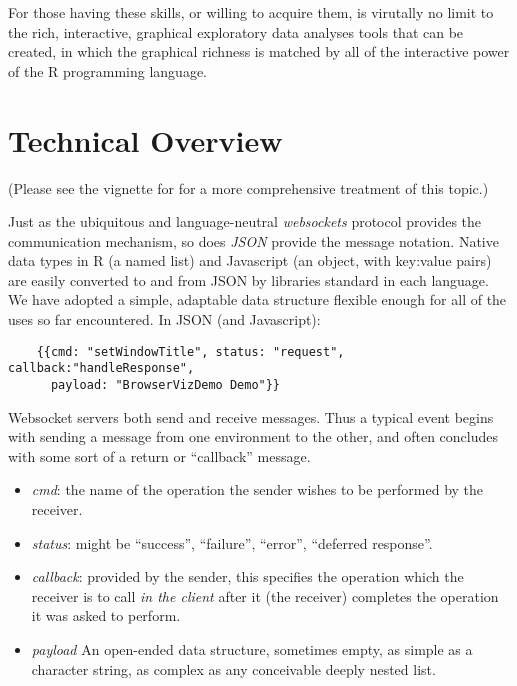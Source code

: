 \documentclass{article}
\begin{document}
For those having these skills, or willing to acquire them, is
virutally no limit to the rich, interactive, graphical exploratory
data analyses tools that can be created, in which the graphical
richness is matched by all of the interactive power of the R
programming language.

\section{Technical Overview}

(Please see the vignette for  for a more comprehensive treatment of this topic.)

Just as the ubiquitous and language-neutral \emph{websockets} protocol provides the
 communication mechanism, so does \emph{JSON} provide the message notation.
Native data types in R (a named list) and Javascript (an object, with key:value pairs) are
easily converted to and from JSON by libraries standard in each language.  We have adopted
a simple, adaptable data structure flexible enough for all of the uses so far encountered.  In
JSON (and Javascript):

\begin{verbatim}
    {{cmd: "setWindowTitle", status: "request", callback:"handleResponse", 
      payload: "BrowserVizDemo Demo"}}
\end{verbatim}

Websocket servers both send and receive messages.  Thus a typical  event begins
with sending a message from one environment to the other, and often concludes with some sort of a return or
``callback'' message.

\begin{itemize}
   \item \emph{cmd}: the name of the operation the sender wishes to be performed by the receiver.
   \item \emph{status}: might be ``success'', ``failure'', ``error'', ``deferred response''.
   \item \emph{callback}: provided by the sender, this specifies the operation which the receiver is 
     to call \emph{in the client} after it (the receiver) completes the operation it was asked to perform.
   \item \emph{payload} An open-ended data structure, sometimes empty, as simple as a character string, as complex
              as any conceivable deeply nested list.  
              
\end{itemize}
\end{document}
